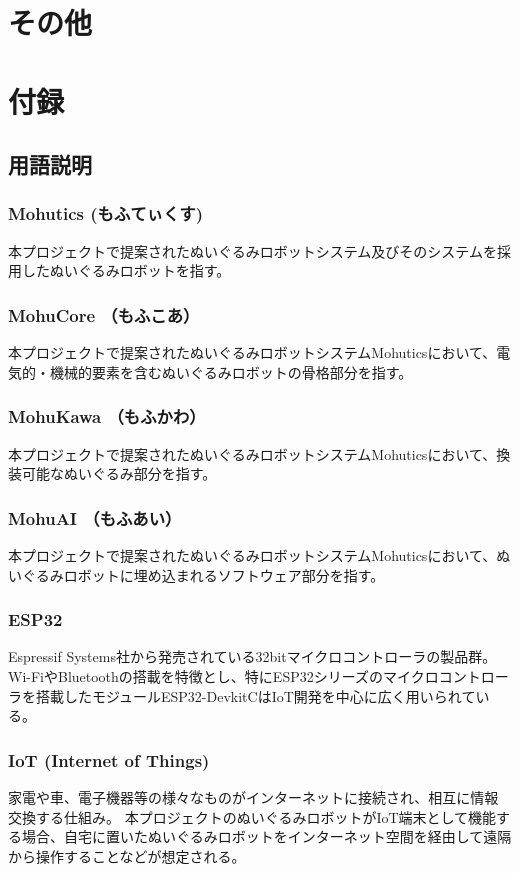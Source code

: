 \documentclass[uplatex,a4paper,12pt]{jsarticle}
\begin{document}
\section{その他}

\section{付録}

\subsection{用語説明}
\subsubsection*{Mohutics (もふてぃくす) \label{term:mohutics}}
本プロジェクトで提案されたぬいぐるみロボットシステム及びそのシステムを採用したぬいぐるみロボットを指す。

\subsubsection*{MohuCore （もふこあ）\label{term:mohucore}}
本プロジェクトで提案されたぬいぐるみロボットシステムMohuticsにおいて、電気的・機械的要素を含むぬいぐるみロボットの骨格部分を指す。
\subsubsection*{MohuKawa （もふかわ）\label{term:mohukawa}}
本プロジェクトで提案されたぬいぐるみロボットシステムMohuticsにおいて、換装可能なぬいぐるみ部分を指す。
\subsubsection*{MohuAI （もふあい）\label{term:mohuai}}
本プロジェクトで提案されたぬいぐるみロボットシステムMohuticsにおいて、ぬいぐるみロボットに埋め込まれるソフトウェア部分を指す。

\subsubsection*{ESP32 \label{term:esp32}}
Espressif Systems社から発売されている32bitマイクロコントローラの製品群。
Wi-FiやBluetoothの搭載を特徴とし、特にESP32シリーズのマイクロコントローラを搭載したモジュールESP32-DevkitCはIoT開発を中心に広く用いられている。

\subsubsection*{IoT (Internet of Things) \label{term:iot}}
家電や車、電子機器等の様々なものがインターネットに接続され、相互に情報交換する仕組み。
本プロジェクトのぬいぐるみロボットがIoT端末として機能する場合、自宅に置いたぬいぐるみロボットをインターネット空間を経由して遠隔から操作することなどが想定される。
\end{document}
